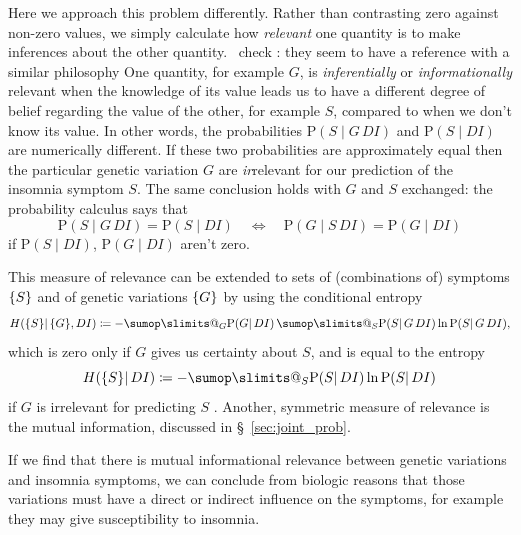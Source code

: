 \documentclass[\ifafour a4paper,12pt,\else a5paper,10pt,\fi%
onecolumn,oneside,article,%
british%
]{memoir}
\makeatletter
\theoremstyle{remark}
\theoremstyle{innote}
\def\sum{\DOTSI\sumop\slimits@}
\newcommand*{\citep}{\parencites}
\newcommand*{\defd}{\coloneqq}
\DeclarePairedDelimiter\set{\{}{\}}
\newcommand*{\p}{\mathrm{P}}%
\renewcommand*{\|}{\mathpunct{|}}
\newcommand*{\sect}{\S}%
\newcommand*{\chap}{ch.}%
\newcommand*{\puzzle}{\maltese}
\newcommand{\mynote}[1]{ {\color{notecolour}\puzzle\ #1}}
\newcommand*{\yD}{D}
\newcommand*{\yG}{G}
\newcommand*{\yS}{S}
\newcommand*{\yI}{I}
\newcommand*{\sH}{H}
\makeatother
\begin{document}
Here we approach this problem differently. Rather than contrasting zero
against non-zero values, we simply calculate how \emph{relevant} one
quantity is to make inferences about the other quantity.\mynote{check
  \citep{stephensetal2009}: they seem to have a reference with a similar
  philosophy} One quantity, for example $\yG$, is \emph{inferentially} or
\emph{informationally} relevant when the knowledge of its value leads us to
have a different degree of belief regarding the value of the other, for
example $\yS$, compared to when we don't know its value. In other words,
the probabilities $\p(\yS \| \yG \,\yD \yI)$ and $\p(\yS \| \yD \yI)$ are
numerically different. If these two probabilities are approximately equal
then the particular genetic variation $\yG$ are \emph{ir}relevant for our
prediction of the insomnia symptom $\yS$. The same conclusion holds with
$\yG$ and $\yS$ exchanged: the probability calculus says that
\begin{equation}
  \label{eq:exchange_irrelevance}
  \p(\yS \| \yG \,\yD \yI) = \p(\yS \| \yD \yI)
  \quad\Longleftrightarrow\quad
    \p(\yG \| \yS \,\yD \yI) = \p(\yG \| \yD \yI)
\end{equation}
if $\p(\yS \| \yD \yI)$, $\p(\yG \| \yD \yI)$ aren't zero.

This measure of relevance can be extended to sets of (combinations of)
symptoms $\set{\yS}$ and of genetic variations $\set{\yG}$ by using the
conditional entropy
\citep{shannon1948,kelly1956}[\sect~14.7]{pressetal1988_r2007}[\chap~2]{coveretal1991_r2006}
\begin{equation}
  \label{eq:conditional_entropy}
  \sH(\set{\yS} \| \set{\yG}, \yD\yI) \defd
  -\sum_{\yG} \p(\yG \| \yD\yI)\,
  \sum_{\yS} \p(\yS \|\yG\,\yD\yI) \ln\p(\yS \|\yG\,\yD\yI),
\end{equation}
which is zero only if $\yG$ gives us certainty about $\yS$, and is equal to
the entropy 
\begin{equation}
  \sH(\set{\yS} \| \yD\yI) \defd
-\sum_{\yS}\p(\yS \|\yD\yI) \ln\p(\yS \|\yD\yI)
  \label{eq:entropy_G}
\end{equation}
if $\yG$ is irrelevant for predicting $\yS$
\citep[\sect~14.7]{pressetal1988_r2007}[\chap~2]{coveretal1991_r2006}.
Another, symmetric measure of relevance is the mutual information,
discussed in \sect~\ref{sec:joint_prob}.

If we find that there is mutual informational relevance between genetic
variations and insomnia symptoms, we can conclude from biologic reasons
that those variations must have a direct or indirect influence on the
symptoms, for example they may give susceptibility to insomnia.
\end{document}
